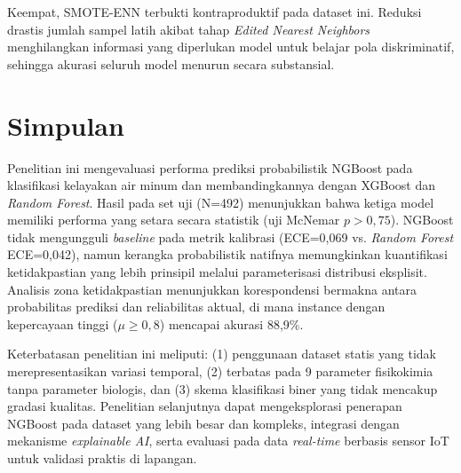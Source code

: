 \documentclass[metlit,article,accept,pdftex,moreauthors]{Definitions/mdpi}
\begin{document}
Keempat, SMOTE-ENN terbukti kontraproduktif pada dataset ini. Reduksi drastis jumlah sampel latih akibat tahap \textit{Edited Nearest Neighbors} menghilangkan informasi yang diperlukan model untuk belajar pola diskriminatif, sehingga akurasi seluruh model menurun secara substansial.

\section{Simpulan}

Penelitian ini mengevaluasi performa prediksi probabilistik NGBoost pada klasifikasi kelayakan air minum dan membandingkannya dengan XGBoost dan \textit{Random Forest}. Hasil pada set uji (N=492) menunjukkan bahwa ketiga model memiliki performa yang setara secara statistik (uji McNemar $p > 0,75$). NGBoost tidak mengungguli \textit{baseline} pada metrik kalibrasi (ECE=0,069 vs. \textit{Random Forest} ECE=0,042), namun kerangka probabilistik natifnya memungkinkan kuantifikasi ketidakpastian yang lebih prinsipil melalui parameterisasi distribusi eksplisit. Analisis zona ketidakpastian menunjukkan korespondensi bermakna antara probabilitas prediksi dan reliabilitas aktual, di mana instance dengan kepercayaan tinggi ($\mu \geq 0,8$) mencapai akurasi 88,9\%.

Keterbatasan penelitian ini meliputi: (1) penggunaan dataset statis yang tidak merepresentasikan variasi temporal, (2) terbatas pada 9 parameter fisikokimia tanpa parameter biologis, dan (3) skema klasifikasi biner yang tidak mencakup gradasi kualitas. Penelitian selanjutnya dapat mengeksplorasi penerapan NGBoost pada dataset yang lebih besar dan kompleks, integrasi dengan mekanisme \textit{explainable AI}, serta evaluasi pada data \textit{real-time} berbasis sensor IoT untuk validasi praktis di lapangan.

\vspace{6pt}





\end{document}
